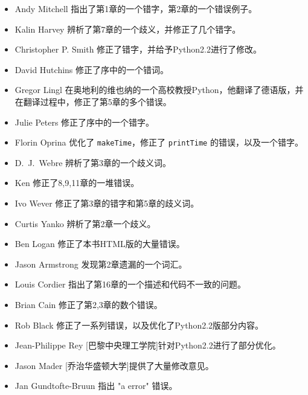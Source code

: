 \documentclass[10pt]{book}
\begin{document}
\begin{itemize}
\item Andy Mitchell 指出了第1章的一个错字，第2章的一个错误例子。

\item Kalin Harvey 辨析了第7章的一个歧义，并修正了几个错字。

\item Christopher P. Smith 修正了错字，并给予Python2.2进行了修改。

\item David Hutchins 修正了序中的一个错词。

\item Gregor Lingl 在奥地利的维也纳的一个高校教授Python，他翻译了德语版，并在翻译过程中，修正了第5章的多个错误。

\item Julie Peters 修正了序中的一个错字。

\item Florin Oprina 优化了 {\tt makeTime}，修正了 {\tt printTime} 的错误，以及一个错字。 

\item D.~J.~Webre 辨析了第3章的一个歧义词。

\item Ken 修正了8,9,11章的一堆错误。

\item Ivo Wever 修正了第3章的错字和第5章的歧义词。

\item Curtis Yanko 辨析了第2章一个歧义。

\item Ben Logan 修正了本书HTML版的大量错误。

\item Jason Armstrong 发现第2章遗漏的一个词汇。

\item Louis Cordier 指出了第16章的一个描述和代码不一致的问题。


\item Brian Cain 修正了第2,3章的数个错误。

\item Rob Black 修正了一系列错误，以及优化了Python2.2版部分内容。

\item Jean-Philippe Rey [巴黎中央理工学院]针对Python2.2进行了部分优化。

\item Jason Mader [乔治华盛顿大学]提供了大量修改意见。

\item Jan Gundtofte-Bruun 指出 "a error" 错误。


\end{itemize}
\end{document}
